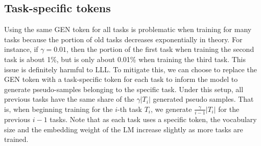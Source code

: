 \documentclass{article} %
\begin{document}
% 
% 
% 

\subsection{Task-specific tokens}
Using the same GEN token for all tasks is problematic when training for many tasks because the portion of old tasks decreases exponentially in theory.
For instance, if $\gamma = 0.01$, then the portion of the first task when training the second task is about 1\%, but is only about 0.01\% when training the third task.
This issue is definitely harmful to LLL.
To mitigate this, we can choose to replace the GEN token with a task-specific token for each task to inform the model to generate pseudo-samples belonging to the specific task.
Under this setup, all previous tasks have the same share of the $\gamma |T_i|$ generated pseudo samples.
That is, when beginning training for the $i$-th task $T_i$, we generate $\frac{\gamma}{i-1} |T_i|$ for the previous $i-1$ tasks.
Note that as each task uses a specific token, the vocabulary size and the embedding weight of the LM increase slightly as more tasks are trained.

\end{document}
